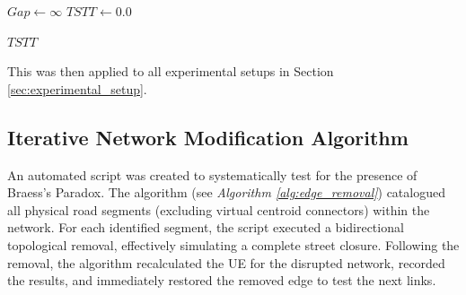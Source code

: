 \begin{algorithm}[H]
\caption{Frank-Wolfe Algorithm for Traffic Assignment}
\label{alg:frank_wolfe}

\BlankLine

$Gap \gets \infty$\;
$TSTT \gets 0.0$\;

\BlankLine


\Return $TSTT$
\end{algorithm}


This was then applied to all experimental setups in Section \ref{sec:experimental_setup}.


\subsection{Iterative Network Modification Algorithm}
\label{sec:inm_algo}

An automated script was created to systematically test for the presence of Braess's Paradox. The algorithm (see \textit{Algorithm \ref{alg:edge_removal}}) catalogued all physical road segments (excluding virtual centroid connectors) within the network. For each identified segment, the script executed a bidirectional topological removal, effectively simulating a complete street closure. Following the removal, the algorithm recalculated the UE for the disrupted network, recorded the results, and immediately restored the removed edge to test the next links.


